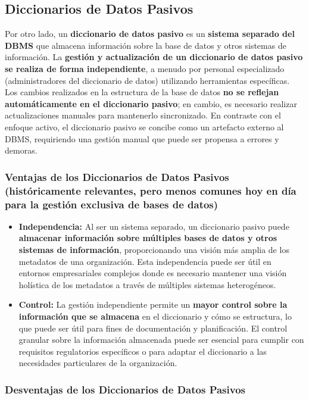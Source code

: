\subsection{Diccionarios de Datos Pasivos}

Por otro lado, un \textbf{diccionario de datos pasivo} es un \textbf{sistema separado del DBMS} que almacena información sobre la base de datos y otros sistemas de información. La \textbf{gestión y actualización de un diccionario de datos pasivo se realiza de forma independiente}, a menudo por personal especializado (administradores del diccionario de datos) utilizando herramientas específicas. Los cambios realizados en la estructura de la base de datos \textbf{no se reflejan automáticamente en el diccionario pasivo}; en cambio, es necesario realizar actualizaciones manuales para mantenerlo sincronizado. En contraste con el enfoque activo, el diccionario pasivo se concibe como un artefacto externo al DBMS, requiriendo una gestión manual que puede ser propensa a errores y demoras.

\subsubsection{Ventajas de los Diccionarios de Datos Pasivos (históricamente relevantes, pero menos comunes hoy en día para la gestión exclusiva de bases de datos)}

\begin{itemize}
    \item \textbf{Independencia:} Al ser un sistema separado, un diccionario pasivo puede \textbf{almacenar información sobre múltiples bases de datos y otros sistemas de información}, proporcionando una visión más amplia de los metadatos de una organización. Esta independencia puede ser útil en entornos empresariales complejos donde es necesario mantener una visión holística de los metadatos a través de múltiples sistemas heterogéneos.
    \item \textbf{Control:} La gestión independiente permite un \textbf{mayor control sobre la información que se almacena} en el diccionario y cómo se estructura, lo que puede ser útil para fines de documentación y planificación. El control granular sobre la información almacenada puede ser esencial para cumplir con requisitos regulatorios específicos o para adaptar el diccionario a las necesidades particulares de la organización.
\end{itemize}

\subsubsection{Desventajas de los Diccionarios de Datos Pasivos}

